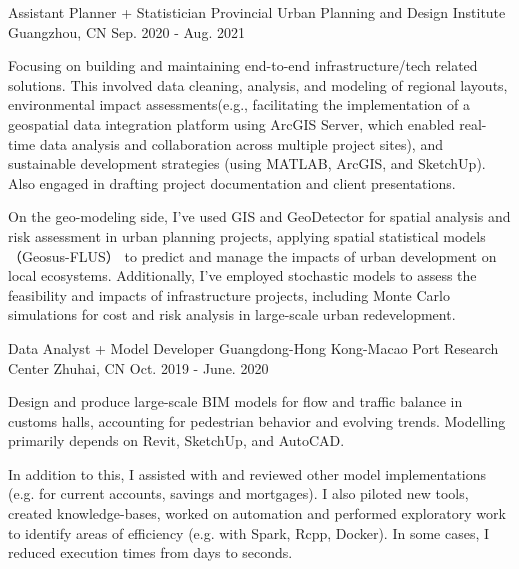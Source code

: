 

\begin{cventries}

  \cventry
    {Assistant Planner + Statistician} %
    {Provincial Urban Planning and Design Institute} %
    {Guangzhou, CN} %
    {Sep. 2020 - Aug. 2021} %
    {
      \begin{cvitems} %
        \item {Focusing on building and maintaining end-to-end infrastructure/tech related solutions. This involved data cleaning, analysis, and modeling of regional layouts, environmental impact assessments(e.g., facilitating the implementation of a geospatial data integration platform using ArcGIS Server, which enabled real-time data analysis and collaboration across multiple project sites), and sustainable development strategies (using MATLAB, ArcGIS, and SketchUp). Also engaged in drafting project documentation and client presentations.}
        \item {On the geo-modeling side, I've used GIS and GeoDetector for spatial analysis and risk assessment in urban planning projects, applying spatial statistical models（Geosus-FLUS） to predict and manage the impacts of urban development on local ecosystems. Additionally, I've employed stochastic models to assess the feasibility and impacts of infrastructure projects, including Monte Carlo simulations for cost and risk analysis in large-scale urban redevelopment. }
      \end{cvitems}
    }

  \cventry
    {Data Analyst + Model Developer} %
    {Guangdong-Hong Kong-Macao Port Research Center} %
    {Zhuhai, CN} %
    {Oct. 2019 - June. 2020} %
    {
      \begin{cvitems} %
        \item {Design and produce large-scale BIM models for flow and traffic balance in customs halls, accounting for pedestrian behavior and evolving trends. Modelling primarily depends on Revit, SketchUp, and AutoCAD.}
        \item {In addition to this, I assisted with and reviewed other model implementations (e.g. for current accounts, savings and mortgages). I also piloted new tools, created knowledge-bases, worked on automation and performed exploratory work to identify areas of efficiency (e.g. with Spark, Rcpp, Docker). In some cases, I reduced execution times from days to seconds.}
      \end{cvitems}
    }

\end{cventries}

